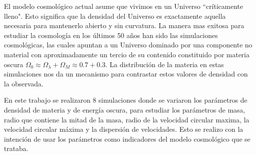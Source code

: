 
El modelo cosmológico actual asume que vivimos en un Universo ``críticamente lleno". Esto significa que la densidad  del Universo es exactamente aquella necesaria para mantenerlo abierto y sin curvatura. La manera mas exitosa para estudiar la cosmología en los últimos 50 años han sido las simulaciones cosmológicas, las cuales apuntan a un Universo dominado por una componente no material con aproximadamente un tercio de su contenido constituido por materia oscura $\Omega_0 \approx \Omega_\lambda + \Omega_M \approx 0.7+ 0.3$. La distribución de la materia en estas simulaciones nos da un mecanismo para contrastar estos valores de densidad con la observada.


 { \blues En este trabajo se realizaron 8 simulaciones donde se variaron los parámetros de densidad de materia y de energía oscura, para estudiar los parámetros de masa, radio que contiene la mitad de la masa, radio de la velocidad circular maxima, la velocidad circular máxima y la dispersión de velocidades. Esto se realizo con la intención de usar los parámetros como indicadores del modelo cosmológico que se trataba.}



